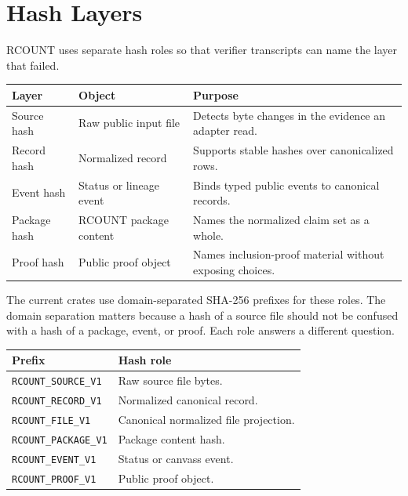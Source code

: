 \section{Hash Layers}

RCOUNT uses separate hash roles so that verifier transcripts can name the layer
that failed.

\begin{center}
\small
\begin{tabularx}{\textwidth}{lXX}
\toprule
Layer & Object & Purpose \\
\midrule
Source hash & Raw public input file & Detects byte changes in the evidence an adapter read. \\
Record hash & Normalized record & Supports stable hashes over canonicalized rows. \\
Event hash & Status or lineage event & Binds typed public events to canonical records. \\
Package hash & RCOUNT package content & Names the normalized claim set as a whole. \\
Proof hash & Public proof object & Names inclusion-proof material without exposing choices. \\
\bottomrule
\end{tabularx}
\end{center}

The current crates use domain-separated SHA-256 prefixes for these roles. The
domain separation matters because a hash of a source file should not be confused
with a hash of a package, event, or proof. Each role answers a different
question.

\begin{center}
\small
\begin{tabularx}{\textwidth}{lX}
\toprule
Prefix & Hash role \\
\midrule
\texttt{RCOUNT\_SOURCE\_V1} & Raw source file bytes. \\
\texttt{RCOUNT\_RECORD\_V1} & Normalized canonical record. \\
\texttt{RCOUNT\_FILE\_V1} & Canonical normalized file projection. \\
\texttt{RCOUNT\_PACKAGE\_V1} & Package content hash. \\
\texttt{RCOUNT\_EVENT\_V1} & Status or canvass event. \\
\texttt{RCOUNT\_PROOF\_V1} & Public proof object. \\
\bottomrule
\end{tabularx}
\end{center}

